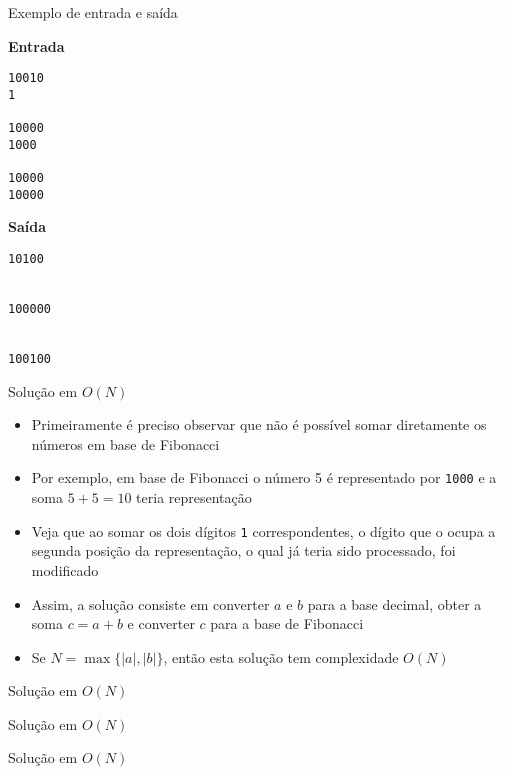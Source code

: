 \begin{frame}[fragile]{Exemplo de entrada e saída}

\begin{minipage}[t]{0.45\textwidth}
\textbf{Entrada}
\begin{verbatim}
10010
1

10000
1000

10000
10000
\end{verbatim}
\end{minipage}
\begin{minipage}[t]{0.5\textwidth}
\textbf{Saída}
\begin{verbatim}
10100


100000


100100
\end{verbatim}
\end{minipage}

\end{frame}


\begin{frame}[fragile]{Solução em $O(N)$}

    \begin{itemize}
        \item Primeiramente é preciso observar que não é possível somar diretamente os números em
            base de Fibonacci

        \item Por exemplo, em base de Fibonacci o número 5 é representado por \texttt{1000} e a
            soma $5 + 5 = 10$ teria representação 

        \item Veja que ao somar os dois dígitos \texttt{1} correspondentes, o dígito que o ocupa
            a segunda posição da representação, o qual já teria sido processado, foi modificado

        \item Assim, a solução consiste em converter $a$ e $b$ para a base decimal, obter a soma
            $c = a + b$ e converter $c$ para a base de Fibonacci

        \item Se $N = \max\{|a|, |b|\}$, então esta solução tem complexidade $O(N)$
    \end{itemize}

\end{frame}

\begin{frame}[fragile]{Solução em $O(N)$}
\end{frame}

\begin{frame}[fragile]{Solução em $O(N)$}
\end{frame}

\begin{frame}[fragile]{Solução em $O(N)$}
\end{frame}
